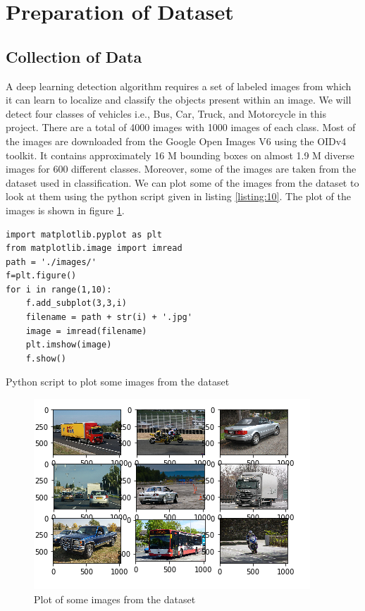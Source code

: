   \section{Preparation of Dataset}
  \subsection{Collection of Data}
  A deep learning detection algorithm requires a set of labeled images from which it can learn to localize and classify the objects present within an image. We will detect four classes of vehicles i.e., Bus, Car, Truck, and Motorcycle in this project. There are a total of 4000 images with 1000 images of each class. Most of the images are downloaded from the Google Open Images V6 using the OIDv4 toolkit. It contains approximately 16 M bounding boxes on almost 1.9 M diverse images for 600 different classes. Moreover, some of the images are taken from the dataset used in classification. We can plot some of the images from the dataset to look at them using the python script given in listing \ref{listing:10}. The plot of the images is shown in figure \ref{fig:5.6}.
\linespread{1.0}
\begin{longlisting}
\begin{verbatim}
import matplotlib.pyplot as plt
from matplotlib.image import imread
path = './images/'
f=plt.figure()
for i in range(1,10):
    f.add_subplot(3,3,i)
    filename = path + str(i) + '.jpg'
    image = imread(filename)
    plt.imshow(image)   
    f.show()
\end{verbatim}
\caption{Python script to plot some images from the dataset}
\label{listing:10}
\end{longlisting}
\begin{figure}[H]
\centering
\captionsetup{justification = centering}
\includegraphics[width = 10 cm, height = 9.5 cm]{CHAPTERS/Chapter-5/images/5.6.PNG}
 \caption{Plot of some images from the dataset } 
 \label{fig:5.6}
 \end{figure}
